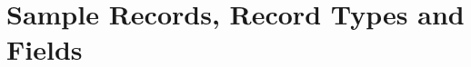 \chapter{{\BibTeX} Sample Records, Record Types and Fields}\label{App:BibTeX-Records}









\endinput
